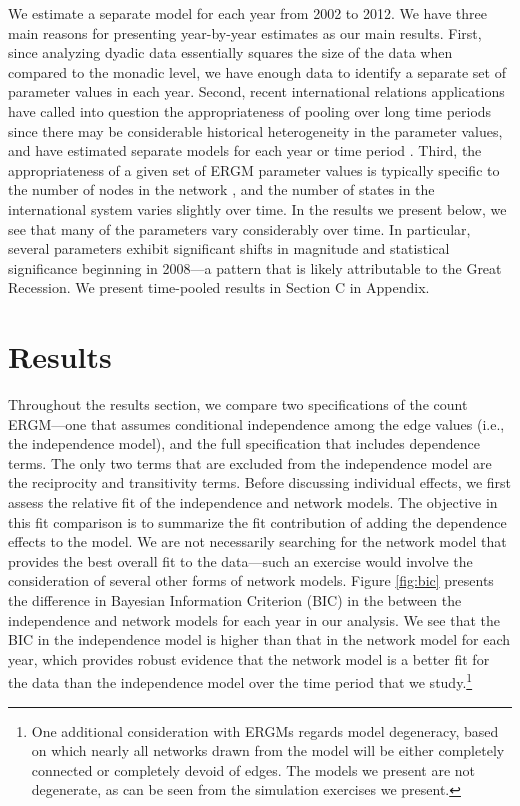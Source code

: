 \documentclass[reqno,onecolumn,letterpaper,12pt]{article}
\begin{document}
We estimate a separate model for each year from 2002 to 2012. We have three main reasons for presenting year-by-year estimates as our main results. First, since analyzing dyadic data essentially squares the size of the data when compared to the monadic level, we have enough data to identify a separate set of parameter values in each year. Second, recent international relations applications have called into question the appropriateness of pooling over long time periods since there may be considerable historical heterogeneity in the parameter values, and have estimated separate models for each year or time period  \citep[see,~e.g.,][]{cranmer2014reciprocity,ward2007persistent}. Third, the appropriateness of a given set of ERGM parameter values is typically specific to the number of nodes in the network \citep{chatterjee2013estimating}, and the number of states in the international system varies slightly over time. In the results we present below, we see that many of the parameters vary considerably over time. In particular, several parameters exhibit significant shifts in magnitude and statistical significance beginning in 2008---a pattern that is likely attributable to the Great Recession. %
We present time-pooled results in Section C in Appendix.


\section{Results}

Throughout the results section, we compare two specifications of the count ERGM---one that assumes conditional independence among the edge values (i.e., the independence model), and the full specification that includes dependence terms. The only two terms that are excluded from the independence model are the reciprocity and transitivity terms. Before discussing individual effects, we first assess the relative fit of the independence and network models. The objective in this fit comparison is to summarize the fit contribution of adding the dependence effects to the model. We are not necessarily searching for the network model that provides the best overall fit to the data---such an exercise would involve the consideration of several other forms of network models. Figure \ref{fig:bic} presents the difference in Bayesian Information Criterion (BIC) in the between the independence and network models for each year in our analysis. We see that the BIC in the independence model is higher than that in the network model for each year, which provides robust evidence that the network model is a better fit for the data than the independence model over the time period that we study.\footnote{One additional consideration with ERGMs regards model degeneracy, based on which nearly all networks drawn from the model will be either completely connected or completely devoid of edges. The models we present are not degenerate, as can be seen from the simulation exercises we present.}
\end{document}
